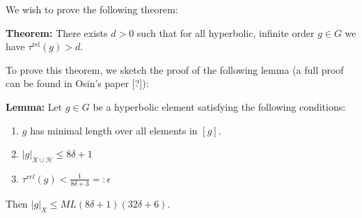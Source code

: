 \documentclass[12pt]{article}
\newcommand{\vs}{\vskip10pt}
\begin{document}
	\vs 
	
	We wish to prove the following theorem: 
	
	\vs 
	
	\textbf{Theorem: } There exists $d > 0$ such that for all hyperbolic, infinite order $g \in G$ we have $\tau^{\text{rel}}(g) > d$. 
	
	\vs 
	
	To prove this theorem, we sketch the proof of the following lemma (a full proof can be found in Osin's paper [?]): 
	
	\vs 
	
	\textbf{Lemma: } Let $g \in G$ be a hyperbolic element satisfying the following conditions:
	
	\begin{enumerate}[label = (\roman*)]
		\item $g$ has minimal length over all elements in $[g]$.
		\item $\vert g \vert_{X \cup \mathcal{H}} \leq 8 \delta + 1$
		\item $\tau^{rel}(g) < \frac{1}{8 \delta + 3} =: \epsilon$
	\end{enumerate}
	
	Then $\vert g \vert_X \leq ML(8 \delta + 1)(32 \delta + 6)$. 
	
\end{document}
